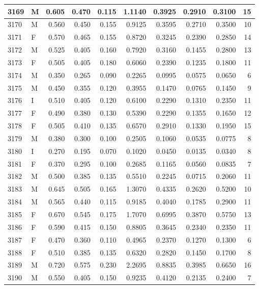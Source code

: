 \documentclass[9pt,twocolumn,twoside,]{pnas-new}
\begin{document}
\begin{tabular}{l|l|r|r|r|r|r|r|r|r}
\hline
3169 & M & 0.605 & 0.470 & 0.115 & 1.1140 & 0.3925 & 0.2910 & 0.3100 & 15\\
\hline
3170 & M & 0.560 & 0.450 & 0.155 & 0.9125 & 0.3595 & 0.2710 & 0.3500 & 10\\
\hline
3171 & F & 0.570 & 0.465 & 0.155 & 0.8720 & 0.3245 & 0.2390 & 0.2850 & 14\\
\hline
3172 & M & 0.525 & 0.405 & 0.160 & 0.7920 & 0.3160 & 0.1455 & 0.2800 & 13\\
\hline
3173 & F & 0.505 & 0.405 & 0.180 & 0.6060 & 0.2390 & 0.1235 & 0.1800 & 11\\
\hline
3174 & M & 0.350 & 0.265 & 0.090 & 0.2265 & 0.0995 & 0.0575 & 0.0650 & 6\\
\hline
3175 & M & 0.450 & 0.355 & 0.120 & 0.3955 & 0.1470 & 0.0765 & 0.1450 & 9\\
\hline
3176 & I & 0.510 & 0.405 & 0.120 & 0.6100 & 0.2290 & 0.1310 & 0.2350 & 11\\
\hline
3177 & F & 0.490 & 0.380 & 0.130 & 0.5390 & 0.2290 & 0.1355 & 0.1650 & 12\\
\hline
3178 & F & 0.505 & 0.410 & 0.135 & 0.6570 & 0.2910 & 0.1330 & 0.1950 & 15\\
\hline
3179 & M & 0.380 & 0.300 & 0.100 & 0.2505 & 0.1060 & 0.0535 & 0.0775 & 8\\
\hline
3180 & I & 0.270 & 0.195 & 0.070 & 0.1020 & 0.0450 & 0.0135 & 0.0340 & 8\\
\hline
3181 & F & 0.370 & 0.295 & 0.100 & 0.2685 & 0.1165 & 0.0560 & 0.0835 & 7\\
\hline
3182 & M & 0.500 & 0.385 & 0.135 & 0.5510 & 0.2245 & 0.0715 & 0.2060 & 11\\
\hline
3183 & M & 0.645 & 0.505 & 0.165 & 1.3070 & 0.4335 & 0.2620 & 0.5200 & 10\\
\hline
3184 & M & 0.565 & 0.440 & 0.115 & 0.9185 & 0.4040 & 0.1785 & 0.2900 & 11\\
\hline
3185 & F & 0.670 & 0.545 & 0.175 & 1.7070 & 0.6995 & 0.3870 & 0.5750 & 13\\
\hline
3186 & F & 0.590 & 0.415 & 0.150 & 0.8805 & 0.3645 & 0.2340 & 0.2350 & 11\\
\hline
3187 & F & 0.470 & 0.360 & 0.110 & 0.4965 & 0.2370 & 0.1270 & 0.1300 & 6\\
\hline
3188 & F & 0.510 & 0.385 & 0.135 & 0.6320 & 0.2820 & 0.1450 & 0.1700 & 8\\
\hline
3189 & M & 0.720 & 0.575 & 0.230 & 2.2695 & 0.8835 & 0.3985 & 0.6650 & 16\\
\hline
3190 & M & 0.550 & 0.405 & 0.150 & 0.9235 & 0.4120 & 0.2135 & 0.2400 & 7\\

\end{tabular}
\end{document}
